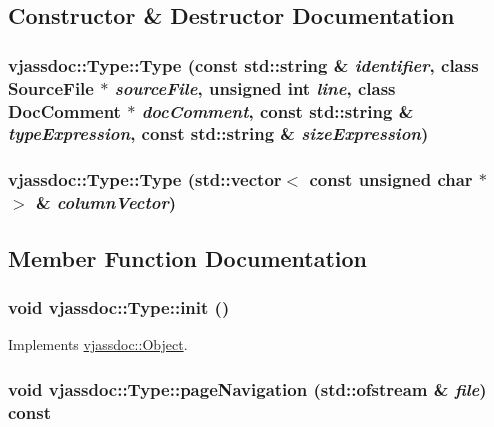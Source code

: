 \subsection{Constructor \& Destructor Documentation}
\hypertarget{classvjassdoc_1_1Type_36d55cd487a11696b179790a299d5e09}{
\subsubsection{\setlength{\rightskip}{0pt plus 5cm}vjassdoc::Type::Type (const std::string \& {\em identifier}, class {\bf SourceFile} $\ast$ {\em sourceFile}, unsigned int {\em line}, class {\bf DocComment} $\ast$ {\em docComment}, const std::string \& {\em typeExpression}, const std::string \& {\em sizeExpression})}}
\label{classvjassdoc_1_1Type_36d55cd487a11696b179790a299d5e09}


\hypertarget{classvjassdoc_1_1Type_f1b3774bf65bd725e70182bc66650ce7}{
\subsubsection{\setlength{\rightskip}{0pt plus 5cm}vjassdoc::Type::Type (std::vector$<$ const unsigned char $\ast$ $>$ \& {\em columnVector})}}
\label{classvjassdoc_1_1Type_f1b3774bf65bd725e70182bc66650ce7}




\subsection{Member Function Documentation}
\hypertarget{classvjassdoc_1_1Type_d4cadc76713790490c55be0bd0af1a1d}{
\subsubsection{\setlength{\rightskip}{0pt plus 5cm}void vjassdoc::Type::init ()}}
\label{classvjassdoc_1_1Type_d4cadc76713790490c55be0bd0af1a1d}




Implements \hyperlink{classvjassdoc_1_1Object_bd43e77dbe80055f5adda67661dfaca4}{vjassdoc::Object}.\hypertarget{classvjassdoc_1_1Type_bc514be419f91658df10d742c6999e47}{
\subsubsection{\setlength{\rightskip}{0pt plus 5cm}void vjassdoc::Type::pageNavigation (std::ofstream \& {\em file}) const}}
\label{classvjassdoc_1_1Type_bc514be419f91658df10d742c6999e47}




